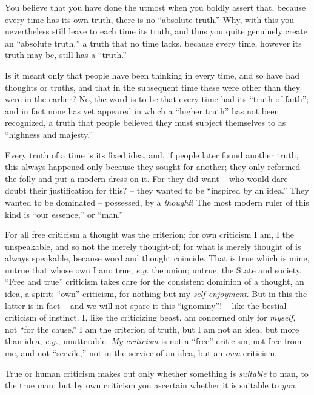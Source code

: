 \documentclass[12pt,a4paper]{book}
\begin{document}
You believe that you have done the utmost when you boldly assert that, because 
every time has its own truth, there is no ``absolute truth.'' Why, with this 
you nevertheless still leave to each time its truth, and thus you quite 
genuinely create an ``absolute truth,'' a truth that no time lacks, because 
every time, however its truth may be, still has a ``truth.''

Is it meant only that people have been thinking in every time, and so have had 
thoughts or truths, and that in the subsequent time these were other than they 
were in the earlier? No, the word is to be that every time had its ``truth of 
faith''; and in fact none has yet appeared in which a ``higher truth'' has 
not been recognized, a truth that people believed they must subject themselves 
to as ``highness and majesty.''

Every truth of a time is its fixed idea, and, if people later found another 
truth, this always happened only because they sought for another; they only 
reformed the folly and put a modern dress on it. For they did want -- who 
would dare doubt their justification for this? -- they wanted to be 
``inspired by an idea.'' They wanted to be dominated -- possessed, by a 
\textit{thought}! The most modern ruler of this kind is ``our essence,'' or 
``man.''

For all free criticism a thought was the criterion; for own criticism I am, I 
the unspeakable, and so not the merely thought-of; for what is merely thought 
of is always speakable, because word and thought coincide. That is true which 
is mine, untrue that whose own I am; true, \textit{e.g.} the union; untrue, 
the State and society. ``Free and true'' criticism takes care for the 
consistent dominion of a thought, an idea, a spirit; ``own'' criticism, for 
nothing but my \textit{self-enjoyment}. But in this the latter is in fact -- 
and we will not spare it this ``ignominy''! -- like the bestial criticism of 
instinct. I, like the criticizing beast, am concerned only for 
\textit{myself}, not ``for the cause.'' I am the criterion of truth, but I 
am not an idea, but more than idea, \textit{e.g.}, unutterable. \textit{My 
criticism} is not a ``free'' criticism, not free from me, and not 
``servile,'' not in the service of an idea, but an \textit{own} criticism.

True or human criticism makes out only whether something is \textit{suitable} 
to man, to the true man; but by own criticism you ascertain whether it is 
suitable to \textit{you}.
\end{document}
